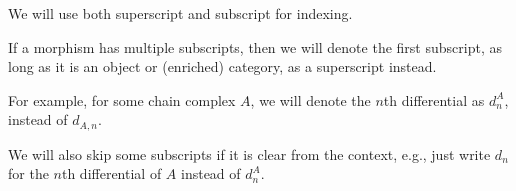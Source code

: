 We will use both superscript and subscript for indexing.
\begin{notation}
    If a morphism has multiple subscripts, then we will denote the first subscript, as long as it is an object or (enriched) category, as a superscript instead.

    For example, for some chain complex \( A \), we will denote the \( n \)th differential as \( d_n^A \), instead of \( d_{A, n} \).

    We will also skip some subscripts if it is clear from the context, e.g., just write \( d_n \) for the \( n \)th differential of \( A \) instead of \( d_n^A \).
\end{notation}